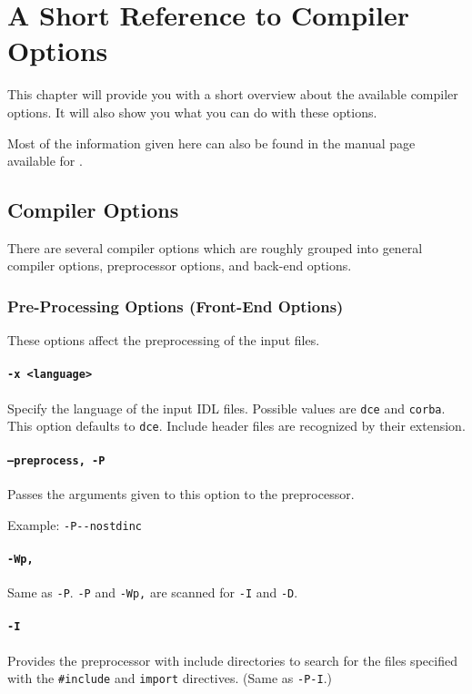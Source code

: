 \chapter{A Short Reference to Compiler Options}

This chapter will provide you with a short overview about the available
compiler options. It will also show you what you can do with these
options.

Most of the information given here can also be found in the manual
page available for \dice{}.

\section{Compiler Options}
There are several compiler options which are roughly grouped
into general compiler options, preprocessor options, and back-end
options.

\subsection{Pre-Processing Options (Front-End Options)}
These options affect the preprocessing of the input files.

\subsubsection{{\tt -x <language>}}
Specify the language of the input IDL files. Possible values are {\tt dce} and
{\tt corba}. This option defaults to {\tt dce}. Include header files are
recognized by their extension.

\subsubsection{{\tt --preprocess, -P}}
Passes the arguments given to this option to the preprocessor.

Example: \verb|-P--nostdinc|

\subsubsection{{\tt -Wp,}}
Same as {\tt -P}. {\tt -P} and {\tt -Wp,} are scanned for
{\tt -I} and {\tt -D}.

\subsubsection{{\tt -I}}
Provides the preprocessor with include directories to search
for the files specified with the \verb|#include| and \verb|import|
directives. (Same as {\tt -P-I}.)

